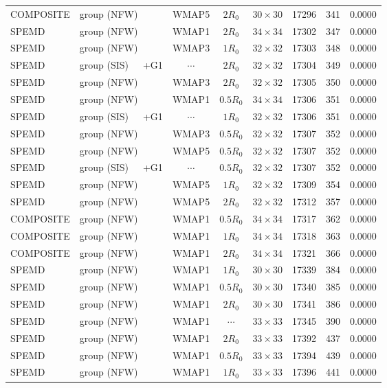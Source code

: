 \documentclass[useAMS,usenatbib]{mnras}
\def\nomicro{$\cdots$}
\def\nodata{$\cdots$}
\begin{document}
\begin{table}
\begin{tabular}{llccccrr}
        COMPOSITE & group (NFW)       &WMAP5 & $2R_{0}$&$30\times30$ & 17296 & 341 & 0.0000\\
        SPEMD     & group (NFW)       &WMAP1 & $2R_{0}$&$34\times34$ & 17302 & 347 & 0.0000\\
        SPEMD     & group (NFW)       &WMAP3 & $1R_{0}$&$32\times32$ & 17303 & 348 & 0.0000\\
        SPEMD     & group (SIS)~~~+G1 &\nodata& $2R_{0}$&$32\times32$ & 17304 & 349 & 0.0000\\
        SPEMD     & group (NFW)       &WMAP3 & $2R_{0}$&$32\times32$ & 17305 & 350 & 0.0000\\
        SPEMD     & group (NFW)       &WMAP1 & $0.5R_{0}$&$34\times34$ & 17306 & 351 & 0.0000\\
        SPEMD     & group (SIS)~~~+G1 &\nodata& $1R_{0}$&$32\times32$ & 17306 & 351 & 0.0000\\
        SPEMD     & group (NFW)       &WMAP3 & $0.5R_{0}$&$32\times32$ & 17307 & 352 & 0.0000\\
        SPEMD     & group (NFW)       &WMAP5 & $0.5R_{0}$&$32\times32$ & 17307 & 352 & 0.0000\\
        SPEMD     & group (SIS)~~~+G1 &\nodata & $0.5R_{0}$&$32\times32$ & 17307 & 352 & 0.0000\\
        SPEMD     & group (NFW)       &WMAP5 & $1R_{0}$&$32\times32$ & 17309 & 354 & 0.0000\\
        SPEMD     & group (NFW)       &WMAP5 & $2R_{0}$&$32\times32$ & 17312 & 357 & 0.0000\\
        COMPOSITE & group (NFW)       &WMAP1 & $0.5R_{0}$&$34\times34$ & 17317 & 362 & 0.0000\\
        COMPOSITE & group (NFW)       &WMAP1 & $1R_{0}$&$34\times34$ & 17318 & 363 & 0.0000\\
        COMPOSITE & group (NFW)       &WMAP1 & $2R_{0}$&$34\times34$ & 17321 & 366 & 0.0000\\
        SPEMD     & group (NFW)       &WMAP1 & $1R_{0}$&$30\times30$ & 17339 & 384 & 0.0000\\
        SPEMD     & group (NFW)       &WMAP1 & $0.5R_{0}$&$30\times30$ & 17340 & 385 & 0.0000\\
        SPEMD     & group (NFW)       &WMAP1 & $2R_{0}$&$30\times30$ & 17341 & 386 & 0.0000\\
        SPEMD     & group (NFW)       &WMAP1 & \nomicro&$33\times33$ & 17345 & 390 & 0.0000\\
        SPEMD     & group (NFW)       &WMAP1 & $2R_{0}$&$33\times33$ & 17392 & 437 & 0.0000\\
        SPEMD     & group (NFW)       &WMAP1 & $0.5R_{0}$&$33\times33$ & 17394 & 439 & 0.0000\\
        SPEMD     & group (NFW)       &WMAP1 & $1R_{0}$&$33\times33$ & 17396 & 441 & 0.0000\\
        \hline
    \end{tabular}
\end{table}


\bsp	%
\label{lastpage}
\end{document}
